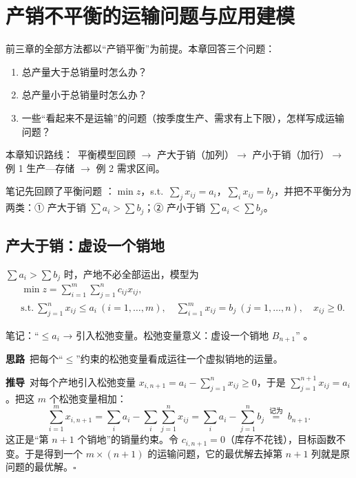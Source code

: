 \section{产销不平衡的运输问题与应用建模}
\noindent 前三章的全部方法都以“产销平衡”为前提。本章回答三个问题：
\begin{enumerate}[label=\arabic*.]
\item 总产量大于总销量时怎么办？
\item 总产量小于总销量时怎么办？
\item 一些“看起来不是运输”的问题（按季度生产、需求有上下限），怎样写成运输问题？
\end{enumerate}
\noindent\textsf{\color{blue2}本章知识路线：}\ 平衡模型回顾 $\to$ 产大于销（加列）$\to$ 产小于销（加行）$\to$ 例 1 生产—存储 $\to$ 例 2 需求区间。

笔记先回顾了平衡问题 \orig：$\min z$，s.t.\ $\sum_j x_{ij}=a_i$，$\sum_i x_{ij}=b_j$，并把不平衡分为两类：① 产大于销 $\sum a_i>\sum b_j$；② 产小于销 $\sum a_i<\sum b_j$。

\subsection{产大于销：虚设一个销地}
\begin{definitionbox}[产大于销的运输问题]
$\sum a_i>\sum b_j$ 时，产地不必全部运出，模型为
\[
\begin{aligned}
&\min z=\sum_{i=1}^m\sum_{j=1}^n c_{ij}x_{ij},\\
&\text{s.t.}\ \sum_{j=1}^n x_{ij}\le a_i\ (i=1,\dots,m),\quad \sum_{i=1}^m x_{ij}=b_j\ (j=1,\dots,n),\quad x_{ij}\ge0.
\end{aligned}
\]
\end{definitionbox}
笔记：“$\le a_i$ → 引入松弛变量。松弛变量意义：虚设一个销地 $B_{n+1}$” \orig。

\begin{proofbox}
\textbf{思路}\ 把每个“$\le$”约束的松弛变量看成运往一个虚拟销地的运量。\par
\textbf{推导}\ 对每个产地引入松弛变量 $x_{i,n+1}=a_i-\sum_{j=1}^n x_{ij}\ge0$，于是 $\sum_{j=1}^{n+1}x_{ij}=a_i$。把这 $m$ 个松弛变量相加：
\[
\sum_{i=1}^m x_{i,n+1}=\sum_i a_i-\sum_i\sum_{j=1}^n x_{ij}=\sum_i a_i-\sum_{j=1}^n b_j\ \overset{\text{记为}}{=}\ b_{n+1}.
\]
这正是“第 $n+1$ 个销地”的销量约束。令 $c_{i,n+1}=0$（库存不花钱），目标函数不变。于是得到一个 $m\times(n+1)$ 的运输问题，它的最优解去掉第 $n+1$ 列就是原问题的最优解。\hfill$\square$
\end{proofbox}

